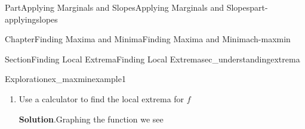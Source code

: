 \documentclass[oneside,10pt,]{tufte-book}
\newcommand{\blocktitlefont}{\relax}
\numberwithin{equation}{chapter}
\newcommand{\ddx}[1]{ \dfrac{d}{dx} \Big[ #1 \Big]  }
\newcommand{\amp}{&}
\begin{document}
\begin{partptx}{Part}{Applying Marginals and Slopes}{}{Applying Marginals and Slopes}{}{}{part-applyingslopes}
\begin{chapterptx}{Chapter}{Finding Maxima and Minima}{}{Finding Maxima and Minima}{}{}{ch-maxmin}
\begin{sectionptx}{Section}{Finding Local Extrema}{}{Finding Local Extrema}{}{}{sec_understandingextrema}
\begin{exploration}{Exploration}{}{ex_maxminexample1}
\begin{enumerate}[font=\bfseries,label=(\alph*),ref=\alph*]
\begin{align*}
= \amp \ddx{ \frac{-1}{3} x^3 } + \ddx{x} + \ddx{1} \\
= \amp \frac{-1}{3} \ddx{x^3} + 1 + 0\\
= \amp \frac{-1}{3}\cdot 3x^2 + + 1\\
= \amp -x^2 + 1
\end{align*}
%
\par
To find when \(f'=0\), simply solve the equation%
\begin{equation*}
-x^2 + 1 = 0
\end{equation*}
Solve the equation by factoring. It is easier to factor equations when the highest power term has a factor of 1.  To do this, multiply both sides of the equation by -1, simplifying, and factoring%
\begin{align*}
(-1) \cdot (-x^2 + 1) \amp =(-1) \cdot = 0 \\
x^2 - 1 \amp = 0 \\
(x+1) (x-1) \amp  = 0
\end{align*}
The only way this can happen is if either the first or second terms equal 0.  In other words, solve%
\begin{align*}
x+1 = 0 \amp \text{ or } \amp x-1=0 \\
x = -1 \amp \text{ or } \amp x=1
\end{align*}
%
\par
We have a singularity when \(f'\ DNE\). Looking at the graph of \(f\), it does not look like there are any singularities.%
\par
Looking at the function, the derivative \(f'(x) = -x^2+1\) is always defined. This confirms that this function \(f\) does not have any singularities.%
\item{}Use a calculator to find the local extrema for \(f\)%
\par\smallskip%
\noindent\textbf{\blocktitlefont Solution}.\hypertarget{ex_maxminexample1-3-2}{}\quad{}Graphing the function we see \begin{image}{0.25}{0.5}{0.25}{}%
%
\end{image}%

\end{enumerate}
\end{exploration}
\end{sectionptx}
\end{chapterptx}
\end{partptx}
\end{document}
